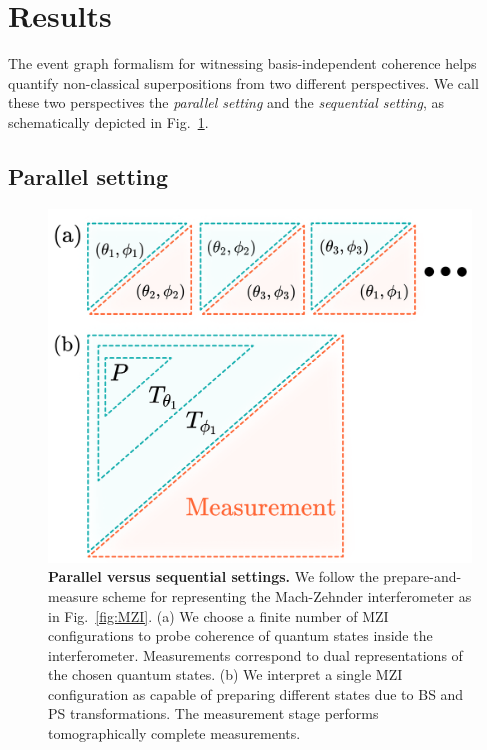 \documentclass[a4paper,twocolumn,11pt,accepted=2024-01-17]{quantumarticle}
\begin{document}
\section{Results}

The event graph formalism for witnessing basis-independent coherence helps quantify non-classical superpositions from two different perspectives. We call these two perspectives the \textit{parallel setting} and the \textit{sequential setting}, as schematically depicted in Fig.~\ref{fig: parallel vs sequential}. 


\subsection{Parallel setting}\label{subsec: parallel setting}
\begin{figure}[tb]
    \centering
    \includegraphics[width=\columnwidth]{Acc_Figures/parallelvssequential.png}
    \caption{\textbf{Parallel versus sequential settings.} We follow the prepare-and-measure scheme for representing the Mach-Zehnder interferometer as in Fig.~\ref{fig:MZI}. (a) We choose a finite number of MZI configurations to probe coherence of quantum states inside the interferometer. Measurements correspond to dual representations of the chosen quantum states. (b) We interpret a single MZI configuration as capable of preparing different states due to BS and PS transformations. The measurement stage performs tomographically complete measurements.}
    \label{fig: parallel vs sequential}
\end{figure}
\end{document}
